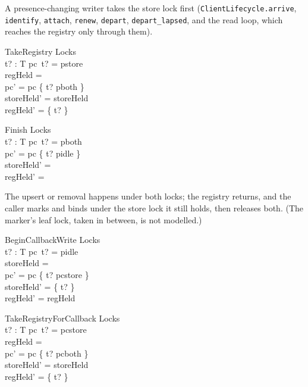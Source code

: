 \documentclass[a4paper,10pt,fleqn]{article}
\begin{document}
A presence-changing writer takes the store lock first
(\texttt{ClientLifecycle.arrive}, \texttt{identify}, \texttt{attach},
\texttt{renew}, \texttt{depart}, \texttt{depart\_lapsed}, and the read loop,
which reaches the registry only through them).

\begin{schema}{TakeRegistry}
  \Delta Locks \\
  t? : T
\where
  pc~t? = pstore \\
  regHeld = \emptyset \\
  pc' = pc \oplus \{ t? \mapsto pboth \} \\
  storeHeld' = storeHeld \\
  regHeld' = \{ t? \}
\end{schema}

\begin{schema}{Finish}
  \Delta Locks \\
  t? : T
\where
  pc~t? = pboth \\
  pc' = pc \oplus \{ t? \mapsto pidle \} \\
  storeHeld' = \emptyset \\
  regHeld' = \emptyset
\end{schema}

The upsert or removal happens under both locks; the registry returns, and the
caller marks and binds under the store lock it still holds, then releases
both. (The marker's leaf lock, taken in between, is not modelled.)

\begin{schema}{BeginCallbackWrite}
  \Delta Locks \\
  t? : T
\where
  pc~t? = pidle \\
  storeHeld = \emptyset \\
  pc' = pc \oplus \{ t? \mapsto pcstore \} \\
  storeHeld' = \{ t? \} \\
  regHeld' = regHeld
\end{schema}

\begin{schema}{TakeRegistryForCallback}
  \Delta Locks \\
  t? : T
\where
  pc~t? = pcstore \\
  regHeld = \emptyset \\
  pc' = pc \oplus \{ t? \mapsto pcboth \} \\
  storeHeld' = storeHeld \\
  regHeld' = \{ t? \}
\end{schema}
\end{document}
